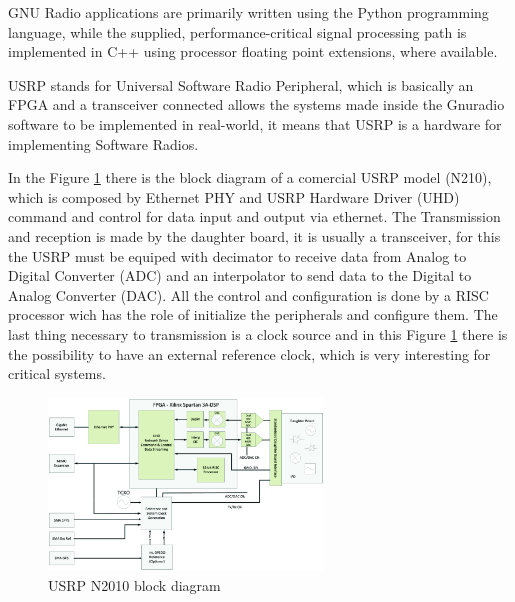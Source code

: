 GNU Radio applications are primarily written using the Python programming
language, while the supplied, performance-critical signal processing path is
implemented in C++ using processor floating point extensions, where available.



 USRP stands for Universal Software Radio Peripheral, which is basically an
FPGA and a transceiver connected allows the systems made inside the Gnuradio
software to be implemented in real-world, it means that USRP is a hardware for
implementing Software Radios.

In the Figure \ref{fig:usrpbd} there is the block diagram of a comercial USRP
model (N210), which is composed by Ethernet PHY and USRP Hardware Driver (UHD)
command and control for data input and output via ethernet. The Transmission and
reception is made by the daughter board, it is usually a transceiver, for this
the USRP must be equiped with  decimator to receive data from Analog to Digital
Converter (ADC) and an interpolator to send data to the Digital to Analog
Converter (DAC). All the control and configuration is done by a RISC processor
wich has the role of initialize the peripherals and configure them. The last
thing necessary to transmission is a clock source and in this Figure
\ref{fig:usrpbd} there is the possibility to have an external reference clock,
which is very interesting for critical systems.

\begin{figure}[htbp]
    \centering
    \includegraphics[width=0.65\textwidth]{./figures/usrp_bd}
    \caption{ USRP N2010 block diagram
    \label{fig:usrpbd}}
\end{figure}

